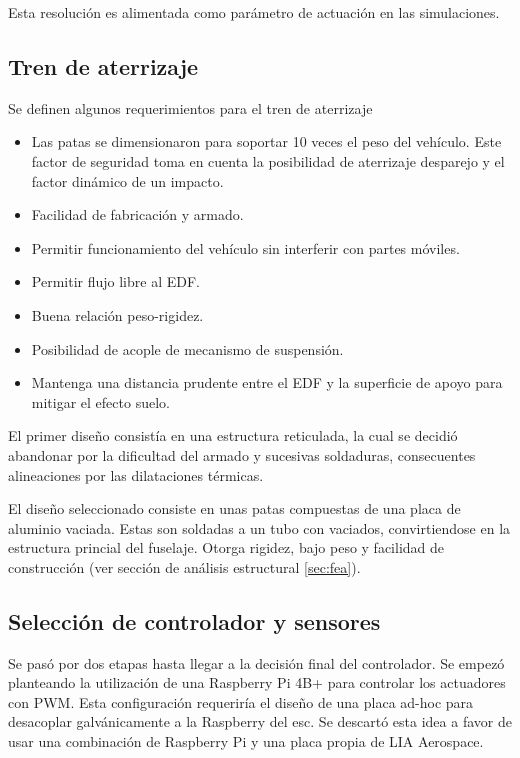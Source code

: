 Esta resolución es alimentada como parámetro de actuación en las simulaciones. 

\subsection{Tren de aterrizaje}
Se definen algunos requerimientos para el tren de aterrizaje
\begin{itemize}
    \item Las patas se dimensionaron para soportar 10 veces el peso del vehículo. Este factor de seguridad toma en cuenta la posibilidad de aterrizaje desparejo y el factor dinámico de un impacto. %
    \item Facilidad de fabricación y armado.
    \item Permitir funcionamiento del vehículo sin interferir con partes móviles.
    \item Permitir flujo libre al EDF.
    \item Buena relación peso-rigidez.
    \item Posibilidad de acople de mecanismo de suspensión.
    \item Mantenga una distancia prudente entre el EDF y la superficie de apoyo para mitigar el efecto suelo.
\end{itemize}

El primer diseño consistía en una estructura reticulada, la cual se decidió abandonar por la dificultad del armado y sucesivas soldaduras, consecuentes alineaciones por las dilataciones térmicas.

\medskip

El diseño seleccionado consiste en unas patas compuestas de una placa de aluminio vaciada. Estas son soldadas a un tubo con vaciados, convirtiendose en la estructura princial del fuselaje. Otorga rigidez, bajo peso y facilidad de construcción (ver sección de análisis estructural \ref{sec:fea}).

\subsection{Selección de controlador y sensores}

Se pasó por dos etapas hasta llegar a la decisión final del controlador. Se empezó planteando la utilización de una Raspberry Pi 4B+ para controlar los actuadores con PWM. Esta configuración requeriría el diseño de una placa ad-hoc para desacoplar galvánicamente a la Raspberry del \gls{esc}. Se descartó esta idea a favor de usar una combinación de Raspberry Pi y una placa propia de LIA Aerospace.

